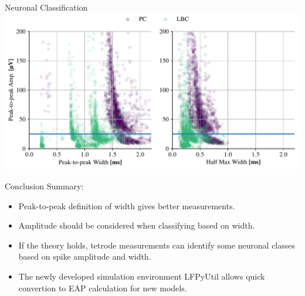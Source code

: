 \documentclass{beamer}
\begin{document}
\begin{frame}{Neuronal Classification}
    \includegraphics[width=\textwidth]{images/TTPC2_LBC_scatter.pdf}
\end{frame}



\begin{frame}{Conclusion}
    Summary:
    \begin{itemize}
        \item Peak-to-peak definition of width gives better measurements.
        \item Amplitude should be considered when classifying based on width.
        \item If the theory holds, tetrode measurements can identify some neuronal classes
            based on spike amplitude and width.
        \item The newly developed simulation environment LFPyUtil allows quick
            convertion to EAP calculation for new models.
    \end{itemize}
\end{frame}
\end{document}
